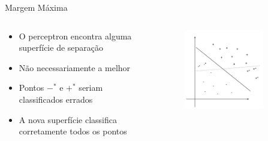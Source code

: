 \documentclass{beamer}
\begin{document}
\begin{frame}{Margem Máxima}
\begin{columns}
    \begin{column}{.49\textwidth}
      \begin{itemize}
      \item {
        O perceptron encontra alguma superfície de separação
      }
      \item {
        Não necessariamente a melhor
      }
      \item {
        Pontos $-^*$ e $+^*$ seriam classificados errados
      }
      \item A nova superfície classifica corretamente todos os pontos
      \end{itemize}
    \end{column}
    \begin{column}{.49\textwidth}
    \begin{figure}
      \centering
      \includegraphics[width=0.8\textwidth]{margem_1.png}
    \end{figure}
    \end{column}
\end{columns}
\end{frame}
\end{document}
